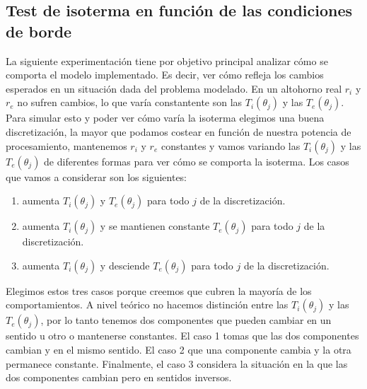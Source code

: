 \subsection{Test de isoterma en función de las condiciones de borde}
La siguiente experimentación tiene por objetivo principal analizar cómo se comporta el modelo implementado. Es decir, ver cómo refleja los cambios esperados en un situación dada del problema modelado.
En un altohorno real $r_i$ y $r_e$ no sufren cambios, lo que varía constantente son las $T_i(\theta_j)$ y las $T_e(\theta_j)$. Para simular esto y poder ver cómo varía la isoterma elegimos una buena discretización, la mayor que podamos costear en función de nuestra potencia de procesamiento, mantenemos $r_i$ y $r_e$ constantes y vamos variando las $T_i(\theta_j)$ y las $T_e(\theta_j)$ de diferentes formas para ver cómo se comporta la isoterma.
Los casos que vamos a considerar son los siguientes:
\begin{enumerate}
 \item aumenta $T_i(\theta_j)$ y $T_e(\theta_j)$ para todo $j$ de la discretización.
 \item aumenta $T_i(\theta_j)$ y se mantienen constante $T_e(\theta_j)$ para todo $j$ de la discretización.
 \item aumenta $T_i(\theta_j)$ y desciende $T_e(\theta_j)$ para todo $j$ de la discretización.
\end{enumerate}
Elegimos estos tres casos porque creemos que cubren la mayoría de los comportamientos. A nivel teórico no hacemos distinción entre las $T_i(\theta_j)$ y las $T_e(\theta_j)$, por lo tanto tenemos dos componentes que pueden cambiar en un sentido u otro o mantenerse constantes. El caso 1 tomas que las dos componentes cambian y en el mismo sentido. El caso 2 que una componente cambia y la otra permanece constante. Finalmente, el caso 3 considera la situación en la que las dos componentes cambian pero en sentidos inversos.
